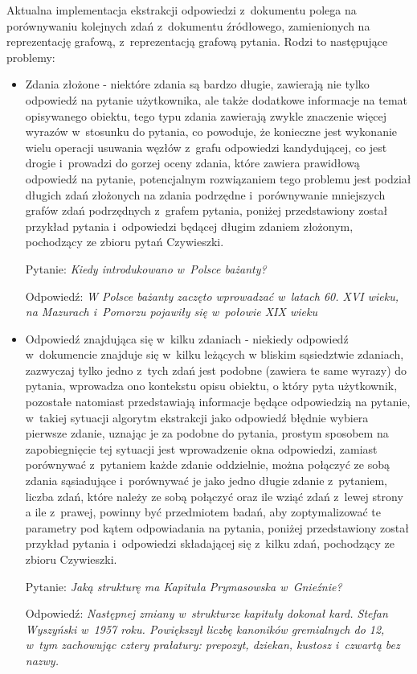 \documentclass[a4paper, twoside, openright, 12pt]{report}
\begin{document}
    Aktualna implementacja ekstrakcji odpowiedzi z~dokumentu polega na porównywaniu kolejnych zdań z~dokumentu źródłowego,
    zamienionych na reprezentację grafową, z~reprezentacją grafową pytania. Rodzi to następujące problemy:
    \begin{itemize}
        \item Zdania złożone - niektóre zdania są bardzo długie, zawierają nie tylko odpowiedź na pytanie użytkownika,
            ale także dodatkowe informacje na temat opisywanego obiektu, tego typu zdania zawierają zwykle znaczenie
            więcej wyrazów w~stosunku do pytania, co powoduje, że konieczne jest wykonanie wielu operacji usuwania węzłów
            z~grafu odpowiedzi kandydującej, co jest drogie i~prowadzi do gorzej oceny zdania, które zawiera prawidłową
            odpowiedź na pytanie, potencjalnym rozwiązaniem tego problemu jest podział długich zdań złożonych na zdania
            podrzędne i~porównywanie mniejszych grafów zdań podrzędnych z~grafem pytania, poniżej przedstawiony został
            przykład pytania i~odpowiedzi będącej długim zdaniem złożonym, pochodzący ze zbioru pytań Czywieszki.

            Pytanie: \emph{Kiedy introdukowano w~Polsce bażanty?}

            Odpowiedź: \emph{W Polsce bażanty zaczęto wprowadzać w~latach 60. XVI wieku, na Mazurach i~Pomorzu pojawiły się w~połowie XIX wieku}

        \item Odpowiedź znajdująca się w~kilku zdaniach - niekiedy odpowiedź w~dokumencie znajduje się w~kilku leżących w
            bliskim sąsiedztwie zdaniach, zazwyczaj tylko jedno z~tych zdań jest podobne (zawiera te same wyrazy) do pytania,
            wprowadza ono kontekstu opisu obiektu, o który pyta użytkownik, pozostałe natomiast przedstawiają informacje
            będące odpowiedzią na pytanie, w~takiej sytuacji algorytm ekstrakcji jako odpowiedź błędnie wybiera pierwsze
            zdanie, uznając je za podobne do pytania, prostym sposobem na zapobiegnięcie tej sytuacji jest wprowadzenie
            okna odpowiedzi, zamiast porównywać z~pytaniem każde zdanie oddzielnie, można połączyć ze sobą zdania sąsiadujące
            i~porównywać je jako jedno długie zdanie z~pytaniem, liczba zdań, które należy ze sobą połączyć oraz ile wziąć
            zdań z~lewej strony a ile z~prawej, powinny być przedmiotem badań, aby zoptymalizować te parametry pod kątem
            odpowiadania na pytania, poniżej przedstawiony został przykład pytania i~odpowiedzi składającej się z~kilku
            zdań, pochodzący ze zbioru Czywieszki.

            Pytanie: \emph{Jaką strukturę ma Kapituła Prymasowska w~Gnieźnie?}

            Odpowiedź: \emph{Następnej zmiany w~strukturze kapituły dokonał kard. Stefan Wyszyński w~1957 roku. Powiększył liczbę kanoników gremialnych do 12, w~tym zachowując cztery prałatury: prepozyt, dziekan, kustosz i~czwartą bez nazwy.}
    \end{itemize}
\end{document}
